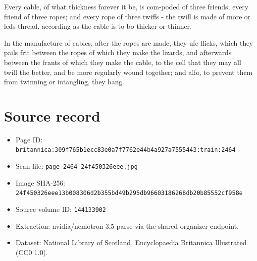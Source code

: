 \documentclass{article}
\begin{document}
Every cable, of what thickness forever it be, is com-poded of three friends, every friend of three ropes; and every rope of three twiffs - the twill is made of more or leds thread, according as the cable is to bo thicker or thinner.

In the manufacture of cables, after the ropes are made, they ufe flicks, which they pails frit between the ropes of which they make the lizards, and afterwards between the frants of which they make the cable, to the cell that they may all twill the better, and be more regularly wound together; and alfo, to prevent them from twinning or intangling, they hang.

\section*{Source record}
\begin{itemize}
\item Page ID: \texttt{britannica:309f765b1ecc83e0a7f7762e44b4a927a7555443:train:2464}
\item Scan file: \texttt{page-2464-24f450326eee.jpg}
\item Image SHA-256: \texttt{24f450326eee13b008306d2b355bd49b295db96603186268db20b85552cf958e}
\item Source volume ID: \texttt{144133902}
\item Extraction: nvidia/nemotron-3.5-parse via the shared organizer endpoint.
\item Dataset: National Library of Scotland, Encyclopaedia Britannica Illustrated (CC0 1.0).
\end{itemize}
\end{document}
